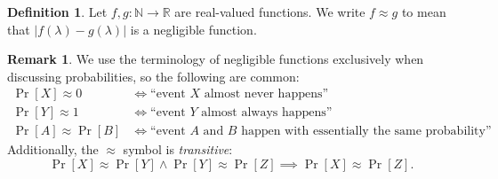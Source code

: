 \documentclass[12pt,openany]{book}
\theoremstyle{definition}
\newtheorem{definition}{Definition}[chapter]
\newtheorem{remark}{Remark}[chapter]
\newcommand{\N}{\mathbb{N}}
\newcommand{\R}{\mathbb{R}}
\renewcommand{\abs}[1]{\left\lvert #1 \right\rvert}
\begin{document}
	\begin{tcolorbox}[colframe=defcolor,title={\color{white}\bf \(f\approx g\)}]
		\begin{definition}
			Let \(f,g:\N\to\R\) are real-valued functions. We write \(f\approx g\) to mean that \(\abs{f(\lambda)-g(\lambda)}\) is a negligible function.
		\end{definition}
	\end{tcolorbox}

	\begin{remark}
		We use the terminology of negligible functions exclusively when discussing probabilities, so the following are common: \begin{align*}
			\Pr[X]\approx 0 &\Leftrightarrow \text{``event $X$ almost never happens''}\\
			\Pr[Y]\approx 1 &\Leftrightarrow \text{``event $Y$ almost always happens''}\\
			\Pr[A]\approx \Pr[B] &\Leftrightarrow \text{``event $A$ and $B$ happen with essentially the same probability''}
		\end{align*}
		Additionally, the \(\approx\) symbol is \textit{transitive}: \[
		\Pr[X]\approx\Pr[Y]\land\Pr[Y]\approx\Pr[Z]\implies\Pr[X]\approx\Pr[Z].
		\]
	\end{remark}

	\newpage
\end{document}
